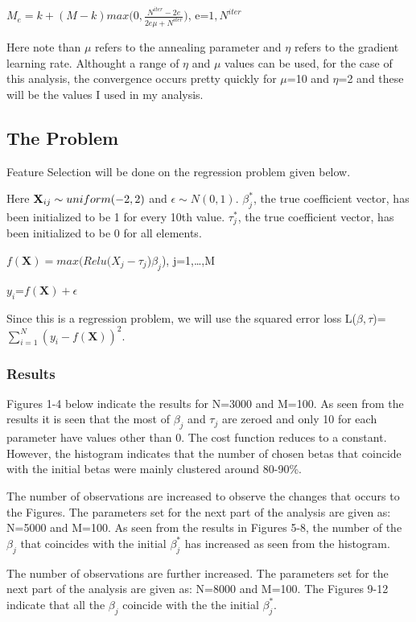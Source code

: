 \documentclass[]{article}
\begin{document}
\hspace{0.5cm}

\(M_e=k+(M-k)max\big(0,\frac{N^{iter}-2e}{2e\mu+N^{iter}}\big)\),
e=\({1,N^{iter}}\)\newline

Here note than \(\mu\) refers to the annealing parameter and \(\eta\)
refers to the gradient learning rate. Althought a range of \(\eta\) and
\(\mu\) values can be used, for the case of this analysis, the
convergence occurs pretty quickly for \(\mu\)=10 and \(\eta\)=2 and
these will be the values I used in my analysis.

\subsection{The Problem}\label{the-problem}

Feature Selection will be done on the regression problem given below.

Here \(\textbf X_{ij}\sim uniform(-2,2)\) and \(\epsilon\sim N(0,1)\).
\(\beta_j^*\), the true coefficient vector, has been initialized to be 1
for every 10th value. \(\tau_j^*\), the true coefficient vector, has
been initialized to be 0 for all elements.

\(f(\textbf{X})=max(Relu(X_{j}-\tau_j\))\(\beta_j\)), j=1,\ldots{},M

\(y_i\)=\(f(\textbf{X})+\epsilon\)\newline

\noindent
Since this is a regression problem, we will use the squared error loss
L(\(\beta,\tau\))=\(\sum_{i=1}^{N} (y_i-f(\textbf{X}))^2.\)\newline

\subsubsection{Results}\label{results}

Figures 1-4 below indicate the results for N=3000 and M=100. As seen
from the results it is seen that the most of \(\beta_j\) and \(\tau_j\)
are zeroed and only 10 for each parameter have values other than 0. The
cost function reduces to a constant. However, the histogram indicates
that the number of chosen betas that coincide with the initial betas
were mainly clustered around 80-90\%.\newline

\noindent
The number of observations are increased to observe the changes that
occurs to the Figures. The parameters set for the next part of the
analysis are given as: N=5000 and M=100. As seen from the results in
Figures 5-8, the number of the \(\beta_j\) that coincides with the
initial \(\beta_j^*\) has increased as seen from the histogram.\newline

\noindent
The number of observations are further increased. The parameters set for
the next part of the analysis are given as: N=8000 and M=100. The
Figures 9-12 indicate that all the \(\beta_j\) coincide with the the
initial \(\beta_j^*\).
\end{document}
